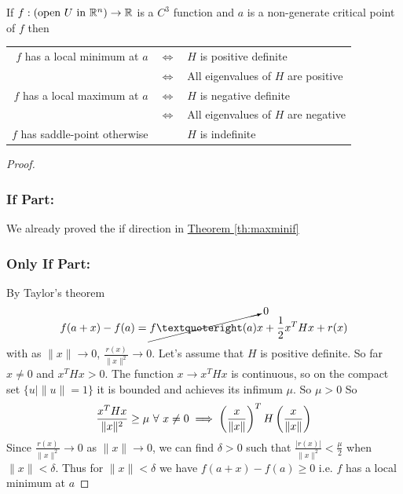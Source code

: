 \begin{theorem}{}{}
If $f:(\text{open }U\text{ in }\mathbb{R}^n )\to \mathbb{R}$ is a $C^3$  function  and $a$ is a non-generate critical point  of $f$  then 



\begin{center}
	\begin{tabular}{rcl}
		$f$ has a local minimum at $a$ & $\iff$ & $H$ is positive definite            \\
		                               & $\iff$ & All eigenvalues of $H$ are positive \\
		$f$ has a local maximum at $a$ & $\iff$ & $H$ is negative definite            \\
		                               & $\iff$ & All eigenvalues of $H$ are negative \\
		$f$ has saddle-point otherwise &        & $H$ is indefinite
	\end{tabular}
\end{center}
\end{theorem}
\begin{proof}
	\subsubsection*{If Part:}
	We already proved the if direction in \hyperref[th:maxminif]{Theorem \ref{th:maxminif}}
	
	\subsubsection*{Only If Part:}
	By Taylor's theorem $$f(a+x)-f(a)=\cancelto{0}{f’(a)}x+\frac12x^THx+r(x)$$with as $\|x\|\to 0$, $\frac{r(x)}{\|x\|^2}\to 0$. Let's assume that $H$ is positive definite. So far $x\neq 0$ and $x^THx>0$. 
	The function $x\to x^THx$ is continuous, so on the compact set $\{u\mid \|u\|=1\}$ it is bounded and achieves its infimum $\mu$. So $\mu>0$ So $$\frac{x^THx}{\|x\|^2}\geq \mu\ \forall \ x\neq 0\implies \lt(\frac{x}{\|x\|}\rt)^TH\lt( \frac{x}{\|x\|} \rt)$$ Since $\frac{r(x)}{\|x\|^2}\to 0$ as $\|x\|\to 0$, we can find $\delta>0$ such that $\frac{|r(x)|}{\|x\|^2}<\frac{\mu}{2}$ when $\|x\|<\delta$. Thus for $\|x\|<\delta$ we have $f(a+x)-f(a)\geq 0$ i.e. $f$ has a local minimum at $a$
\end{proof}

